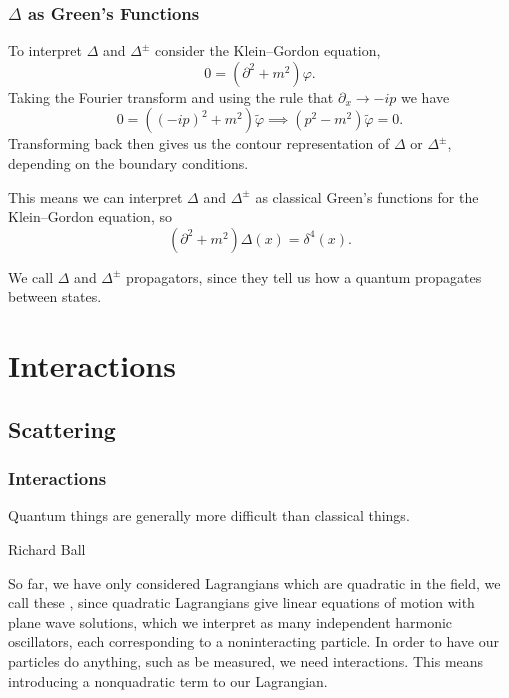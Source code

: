 \documentclass[fleqn]{NotesClass}
\newcommand{\dalembertian}{\partial^2}
\begin{document}
    \section{\texorpdfstring{\(\Delta\)}{Delta} as Green's Functions}
    To interpret \(\Delta\) and \(\Delta^{\pm}\) consider the Klein--Gordon equation,
    \begin{equation}
        0 = (\dalembertian + m^2)\varphi.
    \end{equation}
    Taking the Fourier transform and using the rule that \(\partial_x \to -ip\) we have
    \begin{equation}
        0 = ((-ip)^2 + m^2)\tilde{\varphi} \implies (p^2 - m^2)\tilde{\varphi} = 0.
    \end{equation}
    Transforming back then gives us the contour representation of \(\Delta\) or \(\Delta^{\pm}\), depending on the boundary conditions.
    
    This means we can interpret \(\Delta\) and \(\Delta^{\pm}\) as classical Green's functions for the Klein--Gordon equation, so
    \begin{equation}
        (\dalembertian + m^2)\Delta(x) = \delta^4(x).
    \end{equation}
    
    We call \(\Delta\) and \(\Delta^{\pm}\) propagators, since they tell us how a quantum propagates between states.
    
    \part{Interactions}
    \chapter{Scattering}
    \section{Interactions}
    \epigraph{Quantum things are generally more difficult than classical things.}{Richard Ball}
    So far, we have only considered Lagrangians which are quadratic in the field, we call these , since quadratic Lagrangians give linear equations of motion with plane wave solutions, which we interpret as many independent harmonic oscillators, each corresponding to a noninteracting particle.
    In order to have our particles do anything, such as be measured, we need interactions.
    This means introducing a nonquadratic term to our Lagrangian.
    
\end{document}
